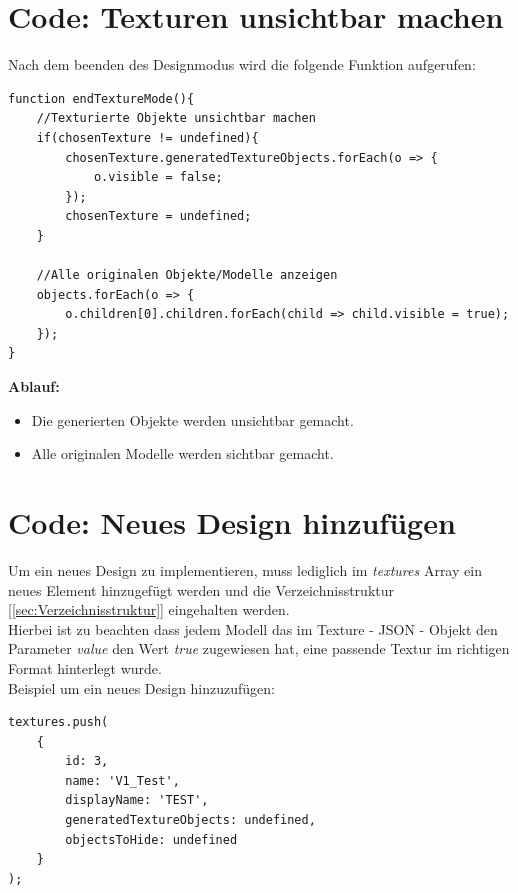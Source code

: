 \section{Code: Texturen unsichtbar machen}
Nach dem beenden des Designmodus wird die folgende Funktion aufgerufen:
\begin{lstlisting}
function endTextureMode(){
    //Texturierte Objekte unsichtbar machen
    if(chosenTexture != undefined){
        chosenTexture.generatedTextureObjects.forEach(o => {
            o.visible = false;
        });
        chosenTexture = undefined;
    }

    //Alle originalen Objekte/Modelle anzeigen
    objects.forEach(o => {
        o.children[0].children.forEach(child => child.visible = true);
    });
}
\end{lstlisting}
\textbf{Ablauf:}
\begin{itemize}
    \item Die generierten Objekte werden unsichtbar gemacht.
    \item Alle originalen Modelle werden sichtbar gemacht.
\end{itemize}
\section{Code: Neues Design hinzufügen}
Um ein neues Design zu implementieren, muss lediglich im \textit{textures} Array ein neues Element hinzugefügt werden und die Verzeichnisstruktur [\ref{sec:Verzeichnisstruktur}] eingehalten werden. \\ Hierbei ist zu beachten dass jedem Modell das im Texture - JSON - Objekt den Parameter \textit{value} den Wert \textit{true} zugewiesen hat, eine passende Textur im richtigen Format hinterlegt wurde. \\
Beispiel um ein neues Design hinzuzufügen:
\begin{lstlisting}
textures.push(
    {
        id: 3,
        name: 'V1_Test',
        displayName: 'TEST',
        generatedTextureObjects: undefined,
        objectsToHide: undefined
    }
);
\end{lstlisting}